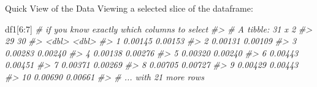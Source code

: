 \documentclass[
  11pt,
  ignorenonframetext,
  svgnames, handout, t]{beamer}
\newenvironment{Shaded}{\begin{snugshade}}{\end{snugshade}}
\newcommand{\CommentTok}[1]{\textcolor[rgb]{0.56,0.35,0.01}{\textit{#1}}}
\newcommand{\DecValTok}[1]{\textcolor[rgb]{0.00,0.00,0.81}{#1}}
\newcommand{\NormalTok}[1]{#1}
\newcommand{\SpecialCharTok}[1]{\textcolor[rgb]{0.00,0.00,0.00}{#1}}
\begin{document}
\begin{frame}[fragile]{Quick View of the Data}
\protect\hypertarget{quick-view-of-the-data-5}{}
Viewing a selected slice of the dataframe:

\footnotesize

\begin{Shaded}
\begin{Highlighting}[]
\NormalTok{df1[}\DecValTok{6}\SpecialCharTok{:}\DecValTok{7}\NormalTok{]  }\CommentTok{\# if you know exactly which columns to select}
\CommentTok{\#\textgreater{} \# A tibble: 31 x 2}
\CommentTok{\#\textgreater{}       \textasciigrave{}29\textasciigrave{}    \textasciigrave{}30\textasciigrave{}}
\CommentTok{\#\textgreater{}      \textless{}dbl\textgreater{}   \textless{}dbl\textgreater{}}
\CommentTok{\#\textgreater{}  1 0.00145 0.00153}
\CommentTok{\#\textgreater{}  2 0.00131 0.00109}
\CommentTok{\#\textgreater{}  3 0.00283 0.00240}
\CommentTok{\#\textgreater{}  4 0.00138 0.00276}
\CommentTok{\#\textgreater{}  5 0.00320 0.00240}
\CommentTok{\#\textgreater{}  6 0.00443 0.00451}
\CommentTok{\#\textgreater{}  7 0.00371 0.00269}
\CommentTok{\#\textgreater{}  8 0.00705 0.00727}
\CommentTok{\#\textgreater{}  9 0.00429 0.00443}
\CommentTok{\#\textgreater{} 10 0.00690 0.00661}
\CommentTok{\#\textgreater{} \# ... with 21 more rows}
\end{Highlighting}
\end{Shaded}

\normalsize
\end{frame}
\end{document}
